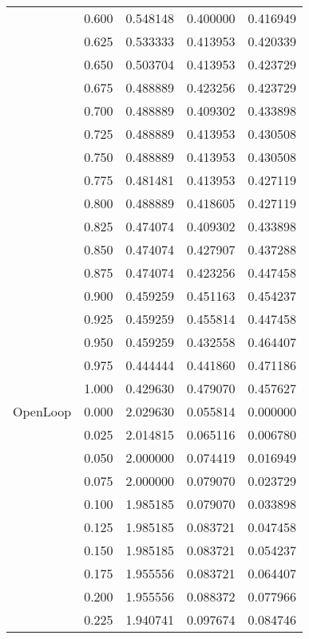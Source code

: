 \begin{tabular}{llrrr}
         & 0.600 &   0.548148 &   0.400000 &   0.416949 \\
         & 0.625 &   0.533333 &   0.413953 &   0.420339 \\
         & 0.650 &   0.503704 &   0.413953 &   0.423729 \\
         & 0.675 &   0.488889 &   0.423256 &   0.423729 \\
         & 0.700 &   0.488889 &   0.409302 &   0.433898 \\
         & 0.725 &   0.488889 &   0.413953 &   0.430508 \\
         & 0.750 &   0.488889 &   0.413953 &   0.430508 \\
         & 0.775 &   0.481481 &   0.413953 &   0.427119 \\
         & 0.800 &   0.488889 &   0.418605 &   0.427119 \\
         & 0.825 &   0.474074 &   0.409302 &   0.433898 \\
         & 0.850 &   0.474074 &   0.427907 &   0.437288 \\
         & 0.875 &   0.474074 &   0.423256 &   0.447458 \\
         & 0.900 &   0.459259 &   0.451163 &   0.454237 \\
         & 0.925 &   0.459259 &   0.455814 &   0.447458 \\
         & 0.950 &   0.459259 &   0.432558 &   0.464407 \\
         & 0.975 &   0.444444 &   0.441860 &   0.471186 \\
         & 1.000 &   0.429630 &   0.479070 &   0.457627 \\
OpenLoop & 0.000 &   2.029630 &   0.055814 &   0.000000 \\
         & 0.025 &   2.014815 &   0.065116 &   0.006780 \\
         & 0.050 &   2.000000 &   0.074419 &   0.016949 \\
         & 0.075 &   2.000000 &   0.079070 &   0.023729 \\
         & 0.100 &   1.985185 &   0.079070 &   0.033898 \\
         & 0.125 &   1.985185 &   0.083721 &   0.047458 \\
         & 0.150 &   1.985185 &   0.083721 &   0.054237 \\
         & 0.175 &   1.955556 &   0.083721 &   0.064407 \\
         & 0.200 &   1.955556 &   0.088372 &   0.077966 \\
         & 0.225 &   1.940741 &   0.097674 &   0.084746 \\

\end{tabular}
